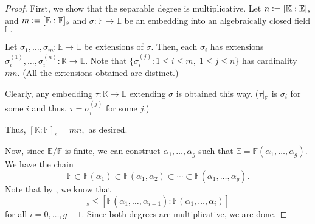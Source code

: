 \towerlawsep*\label{thm:towerlawsep2}
\begin{flushright}\hyperref[thm:towerlawsep]{\upsym}\end{flushright}
\begin{proof}
    First, we show that the separable degree is multiplicative. Let $n \vcentcolon= [\mathbb{K} : \mathbb{E}]_s$ and $m \vcentcolon= [\mathbb{E} : \mathbb{F}]_s$ and $\sigma : \mathbb{F} \to \mathbb{L}$ be an embedding into an algebraically closed field $\mathbb{L}.$ 

    Let $\sigma_1, \ldots, \sigma_m : \mathbb{E} \to \mathbb{L}$ be extensions of $\sigma.$ Then, each $\sigma_i$ has extensions $\sigma_i^{(1)}, \ldots, \sigma_i^{(n)} : \mathbb{K} \to \mathbb{L}.$ Note that $\{\sigma_i^{(j)} : 1 \le i \le m,\; 1 \le j \le n\}$ has cardinality $mn.$ (All the extensions obtained are distinct.)

    Clearly, any embedding $\tau : \mathbb{K} \to \mathbb{L}$ extending $\sigma$ is obtained this way. ($\tau|_{\mathbb{E}}$ is $\sigma_i$ for some $i$ and thus, $\tau = \sigma_i^{(j)}$ for some $j.$) 

    Thus, $[\mathbb{K} : \mathbb{F}]_s = mn,$ as desired. 

    Now, since $\mathbb{E}/\mathbb{F}$ is finite, we can construct $\alpha_1, \ldots, \alpha_g$ such that $\mathbb{E} = \mathbb{F}(\alpha_1, \ldots, \alpha_g).$ We have the chain
    \begin{equation*} 
        \mathbb{F} \subset \mathbb{F}(\alpha_1) \subset \mathbb{F}(\alpha_1, \alpha_2) \subset \cdots \subset \mathbb{F}(\alpha_1, \ldots, \alpha_g).
    \end{equation*}
    Note that by , we know that 
    \begin{equation*} 
        [\mathbb{F}(\alpha_1, \ldots, \alpha_{i + 1}) : \mathbb{F}(\alpha_1, \ldots, \alpha_i)]_s \le [\mathbb{F}(\alpha_1, \ldots, \alpha_{i + 1}) : \mathbb{F}(\alpha_1, \ldots, \alpha_i)]
    \end{equation*}
    for all $i = 0, \ldots, g - 1.$ Since both degrees are multiplicative, we are done.
\end{proof}

